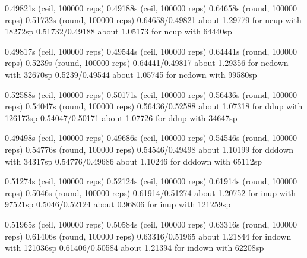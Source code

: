 0.49821s (ceil, 100000 reps)                            0.49188s (ceil, 100000 reps)                           
0.64658s (round, 100000 reps)                           0.51732s (round, 100000 reps)                          
0.64658/0.49821 about 1.29779 for ncup with 18272sp     0.51732/0.49188 about 1.05173 for ncup with 64440sp    
                                                                                                               
0.49817s (ceil, 100000 reps)                            0.49544s (ceil, 100000 reps)                           
0.64441s (round, 100000 reps)                           0.5239s (round, 100000 reps)                           
0.64441/0.49817 about 1.29356 for ncdown with 32670sp   0.5239/0.49544 about 1.05745 for ncdown with 99580sp   
                                                                                                               
0.52588s (ceil, 100000 reps)                            0.50171s (ceil, 100000 reps)                           
0.56436s (round, 100000 reps)                           0.54047s (round, 100000 reps)                          
0.56436/0.52588 about 1.07318 for ddup with 126173sp    0.54047/0.50171 about 1.07726 for ddup with 34647sp    
                                                                                                               
0.49498s (ceil, 100000 reps)                            0.49686s (ceil, 100000 reps)                           
0.54546s (round, 100000 reps)                           0.54776s (round, 100000 reps)                          
0.54546/0.49498 about 1.10199 for dddown with 34317sp   0.54776/0.49686 about 1.10246 for dddown with 65112sp  
                                                                                                               
0.51274s (ceil, 100000 reps)                            0.52124s (ceil, 100000 reps)                           
0.61914s (round, 100000 reps)                           0.5046s (round, 100000 reps)                           
0.61914/0.51274 about 1.20752 for inup with 97521sp     0.5046/0.52124 about 0.96806 for inup with 121259sp    
                                                                                                               
0.51965s (ceil, 100000 reps)                            0.50584s (ceil, 100000 reps)                           
0.63316s (round, 100000 reps)                           0.61406s (round, 100000 reps)                          
0.63316/0.51965 about 1.21844 for indown with 121036sp  0.61406/0.50584 about 1.21394 for indown with 62208sp  
                                                                                                               
